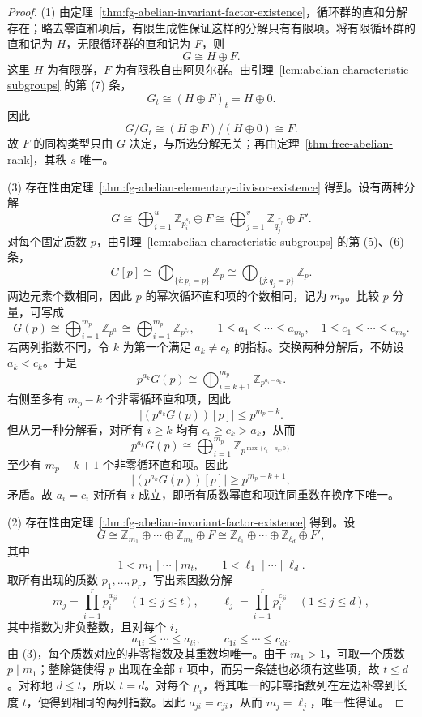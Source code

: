 \begin{proof}
(1) 由定理~\ref{thm:fg-abelian-invariant-factor-existence}，循环群的直和分解存在；略去零直和项后，有限生成性保证这样的分解只有有限项。将有限循环群的直和记为 $H$，无限循环群的直和记为 $F$，则
\[
  G\cong H\oplus F.
\]
这里 $H$ 为有限群，$F$ 为有限秩自由阿贝尔群。由引理~\ref{lem:abelian-characteristic-subgroups} 的第 (7) 条，
\[
  G_t\cong(H\oplus F)_t=H\oplus0.
\]
因此
\[
  G/G_t\cong(H\oplus F)/(H\oplus0)\cong F.
\]
故 $F$ 的同构类型只由 $G$ 决定，与所选分解无关；再由定理~\ref{thm:free-abelian-rank}，其秩 $s$ 唯一。

(3) 存在性由定理~\ref{thm:fg-abelian-elementary-divisor-existence} 得到。设有两种分解
\[
  G\cong\bigoplus_{i=1}^{u}\mathbb Z_{p_i^{s_i}}\oplus F
  \cong\bigoplus_{j=1}^{v}\mathbb Z_{q_j^{r_j}}\oplus F'.
\]
对每个固定质数 $p$，由引理~\ref{lem:abelian-characteristic-subgroups} 的第 (5)、(6) 条，
\[
  G[p]\cong
  \bigoplus_{\{i:p_i=p\}}\mathbb Z_p
  \cong\bigoplus_{\{j:q_j=p\}}\mathbb Z_p.
\]
两边元素个数相同，因此 $p$ 的幂次循环直和项的个数相同，记为 $m_p$。比较 $p$ 分量，可写成
\[
  G(p)\cong\bigoplus_{i=1}^{m_p}\mathbb Z_{p^{a_i}}
       \cong\bigoplus_{i=1}^{m_p}\mathbb Z_{p^{c_i}},
  \qquad
  1\leq a_1\leq\cdots\leq a_{m_p},\quad
  1\leq c_1\leq\cdots\leq c_{m_p}.
\]
若两列指数不同，令 $k$ 为第一个满足 $a_k\ne c_k$ 的指标。交换两种分解后，不妨设 $a_k<c_k$。于是
\[
  p^{a_k}G(p)\cong
  \bigoplus_{i=k+1}^{m_p}\mathbb Z_{p^{a_i-a_k}}.
\]
右侧至多有 $m_p-k$ 个非零循环直和项，因此
\[
  \bigl|(p^{a_k}G(p))[p]\bigr|\leq p^{m_p-k}.
\]
但从另一种分解看，对所有 $i\geq k$ 均有 $c_i\geq c_k>a_k$，从而
\[
  p^{a_k}G(p)\cong
  \bigoplus_{i=1}^{m_p}\mathbb Z_{p^{\max(c_i-a_k,0)}}
\]
至少有 $m_p-k+1$ 个非零循环直和项。因此
\[
  \bigl|(p^{a_k}G(p))[p]\bigr|\geq p^{m_p-k+1},
\]
矛盾。故 $a_i=c_i$ 对所有 $i$ 成立，即所有质数幂直和项连同重数在换序下唯一。

(2) 存在性由定理~\ref{thm:fg-abelian-invariant-factor-existence} 得到。设
\[
  G\cong\mathbb Z_{m_1}\oplus\cdots\oplus\mathbb Z_{m_t}\oplus F
   \cong\mathbb Z_{\ell_1}\oplus\cdots\oplus\mathbb Z_{\ell_d}\oplus F',
\]
其中
\[
  1<m_1\mid\cdots\mid m_t,\qquad
  1<\ell_1\mid\cdots\mid\ell_d.
\]
取所有出现的质数 $p_1,\ldots,p_r$，写出素因数分解
\[
  m_j=\prod_{i=1}^{r}p_i^{a_{ji}}\quad(1\leq j\leq t),
  \qquad
  \ell_j=\prod_{i=1}^{r}p_i^{c_{ji}}\quad(1\leq j\leq d),
\]
其中指数为非负整数，且对每个 $i$，
\[
  a_{1i}\leq\cdots\leq a_{ti},\qquad
  c_{1i}\leq\cdots\leq c_{di}.
\]
由 (3)，每个质数对应的非零指数及其重数均唯一。由于 $m_1>1$，可取一个质数 $p\mid m_1$；整除链使得 $p$ 出现在全部 $t$ 项中，而另一条链也必须有这些项，故 $t\leq d$。对称地 $d\leq t$，所以 $t=d$。对每个 $p_i$，将其唯一的非零指数列在左边补零到长度 $t$，便得到相同的两列指数。因此 $a_{ji}=c_{ji}$，从而 $m_j=\ell_j$，唯一性得证。
\end{proof}

